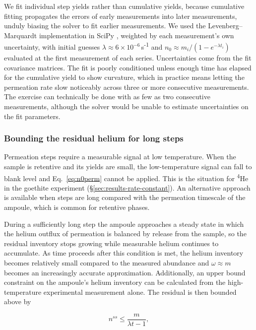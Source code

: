 We fit individual step yields rather than cumulative yields, because cumulative fitting propagates the errors of early measurements into later measurements, unduly biasing the solver to fit earlier measurements. We used the Levenberg--Marquardt implementation in SciPy \citep{virtanen2020}, weighted by each measurement's own uncertainty, with initial guesses $\lambda \approx 6\times10^{-6}$\,s\textsuperscript{-1} and $n_{0} \approx m_{i}/(1-e^{-\lambda t_{i}})$ evaluated at the first measurement of each series. Uncertainties come from the fit covariance matrices. The fit is poorly conditioned unless enough time has elapsed for the cumulative yield to show curvature, which in practice means letting the permeation rate slow noticeably across three or more consecutive measurements. The exercise can technically be done with as few as two consecutive measurements, although the solver would be unable to estimate uncertainties on the fit parameters. 

\subsubsection{Bounding the residual helium for long steps}\label{sec:bounding}

Permeation steps require a measurable signal at low temperature. When the sample is retentive and its yields are small, the low-temperature signal can fall to blank level and Eq.~\eqref{eq:n0perm} cannot be applied. This is the situation for \textsuperscript{4}He in the goethite experiment (\S\ref{sec:results-rate-constant}). An alternative approach is available when steps are long compared with the permeation timescale of the ampoule, which is common for retentive phases.

During a sufficiently long step the ampoule approaches a steady state in which the helium outflux of permeation is balanced by release from the sample, so the residual inventory stops growing while measurable helium continues to accumulate. As time proceeds after this condition is met, the helium inventory becomes relatively small compared to the measured abundance and $\omega \approx m$ becomes an increasingly accurate approximation. Additionally, an upper bound constraint on the ampoule's helium inventory can be calculated from the high-temperature experimental measurement alone. The residual is then bounded above by

\begin{equation}
\label{eq:steadystate}
n^{ss} \leq \frac{m}{\lambda t - 1} ,
\end{equation}

